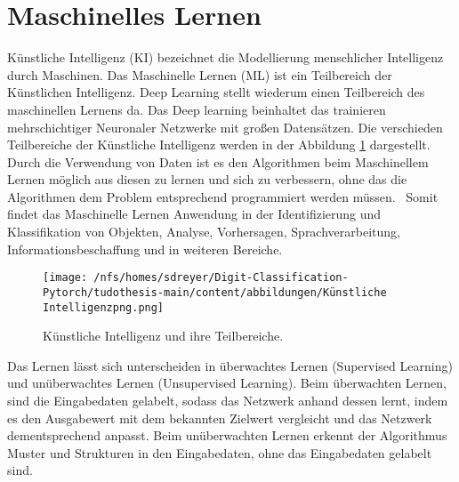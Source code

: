 \section{Maschinelles Lernen}
Künstliche Intelligenz (KI) bezeichnet die Modellierung menschlicher Intelligenz durch Maschinen. 
Das Maschinelle Lernen (ML) ist ein Teilbereich der Künstlichen Intelligenz. Deep Learning stellt 
wiederum einen Teilbereich des maschinellen Lernens da. Das Deep learning beinhaltet das trainieren mehrschichtiger Neuronaler Netzwerke mit großen Datensätzen.
Die verschieden Teilbereiche der Künstliche Intelligenz werden in der Abbildung \ref{fig:KI} dargestellt.
Durch die Verwendung von Daten ist es den Algorithmen beim 
Maschinellem Lernen möglich aus diesen zu lernen und sich zu verbessern, ohne das die Algorithmen dem Problem entsprechend programmiert werden müssen.~\cite{kleesiek2020}
Somit findet das Maschinelle Lernen Anwendung in der Identifizierung und Klassifikation von Objekten, Analyse, Vorhersagen, 
Sprachverarbeitung, Informationsbeschaffung und in weiteren Bereiche.~\cite{shinde2018}
\begin{figure}[H]
  \centering
  \texttt{[image: /nfs/homes/sdreyer/Digit-Classification-Pytorch/tudothesis-main/content/abbildungen/Künstliche Intelligenzpng.png]}
  \caption{Künstliche Intelligenz und ihre Teilbereiche.~\cite{kleesiek2020}}
  \label{fig:KI}
\end{figure}
Das Lernen lässt sich unterscheiden in überwachtes Lernen (Supervised Learning) und unüberwachtes Lernen (Unsupervised Learning).
Beim überwachten Lernen, sind die Eingabedaten gelabelt, sodass das Netzwerk anhand dessen lernt, indem es den Ausgabewert mit dem bekannten Zielwert 
vergleicht und das Netzwerk dementsprechend anpasst.
Beim unüberwachten Lernen erkennt der Algorithmus Muster und Strukturen in den Eingabedaten, ohne das Eingabedaten gelabelt sind.~\cite{kleesiek2020}
